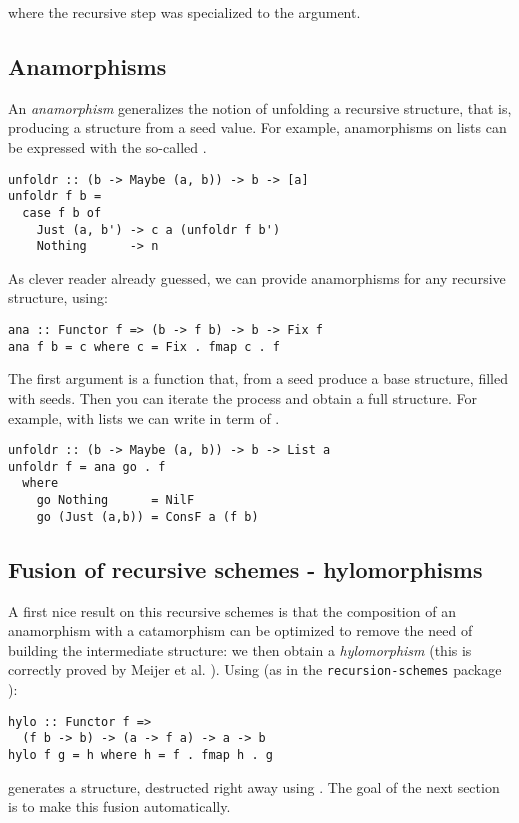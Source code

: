 \noindent
where the recursive step was specialized to the  argument.

\subsection{Anamorphisms}
An \emph{anamorphism} generalizes the notion of unfolding a recursive structure, that is, producing a structure from a seed value.
For example, anamorphisms on lists can be expressed with the so-called .
\begin{verbatim}
unfoldr :: (b -> Maybe (a, b)) -> b -> [a]
unfoldr f b =
  case f b of
    Just (a, b') -> c a (unfoldr f b')
    Nothing      -> n
\end{verbatim}

\noindent As clever reader already guessed, we can provide anamorphisms for any recursive structure, using:
\begin{verbatim}
ana :: Functor f => (b -> f b) -> b -> Fix f
ana f b = c where c = Fix . fmap c . f
\end{verbatim}
The first argument is a function that, from a seed produce a base structure, filled with seeds. Then you can iterate the process and obtain a full structure. For example, with lists we can write  in term of .
\begin{verbatim}
unfoldr :: (b -> Maybe (a, b)) -> b -> List a
unfoldr f = ana go . f
  where
    go Nothing      = NilF
    go (Just (a,b)) = ConsF a (f b)
\end{verbatim}

\subsection{Fusion of recursive schemes - hylomorphisms}
A first nice result on this recursive schemes is that the composition of an anamorphism with a catamorphism can be optimized to remove the need of building the intermediate structure: we then obtain a \emph{hylomorphism} (this is correctly proved by Meijer et al. \cite{4cec4a43c86444479dc0003182424795}).
Using (as in the \verb|recursion-schemes| package \cite{ekmett:eschems}):
\begin{verbatim}
hylo :: Functor f =>
  (f b -> b) -> (a -> f a) -> a -> b
hylo f g = h where h = f . fmap h . g
\end{verbatim}
\noindent {} generates a structure, destructed right away using .
The goal of the next section is to make this fusion automatically.